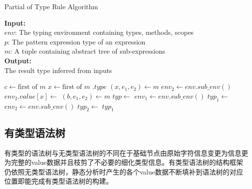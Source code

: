 \begin{algorithm}[!htbp]
    \small
    \caption{Partial of Type Rule Algorithm}\label{alg:typerule}
     \hspace*{0.02in} {\bf Input:} \\
	\hspace*{0.04in} $env$: The typing environment containing types, methods, scopes \\
	\hspace*{0.04in} $p$: The pattern expression type of an expression \\
	\hspace*{0.04in} $m$: A tuple containing abstract tree of sub-expressions \\
	\hspace*{0.02in} {\bf Output:} \\
	\hspace*{0.04in} The result type inferred from inputs
    \begin{algorithmic}[1]
        \State $c\gets \text{first of } m$ 
        \State \Return {} 
        \State $x\gets \text{first of } m$ 
        \State \Return {}$.type$ 
        \State $(x,e_1,e_2)\gets m$
        \State $env_2\gets env.sub\_env()$ 
        \State $env_2.value[x]\gets$ 
        \State \Return {} 
        \State $(b,e_1,e_2)\gets m$
        \State $typ \gets $
        \State $env_1\gets env.sub\_env()$ 
        \State $typ_1\gets$ 
        \State $env_2\gets env.sub\_env()$
        \State $typ_2\gets$ 
        \State \Return $typ_1$
        \EndIf 
        \EndProcedure
    \end{algorithmic}
\end{algorithm}
\subsection{有类型语法树}
有类型的语法树与无类型语法树的不同在于基础节点由原始字符信息变更为信息更为完整的value数据并且枝剪了不必要的细化类型信息。有类型语法树的结构框架仍依照无类型语法树，静态分析时产生的各个value数据不断填补到语法树的对应位置即能完成有类型语法树的构建。
